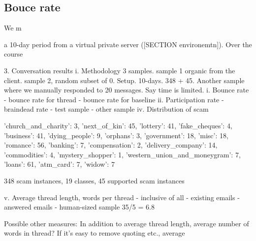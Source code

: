 \begin{center}
\end{center}

\subsection{Bouce rate}
We m


a 10-day period from a virtual private server ([SECTION environemtn]). Over the course 

	3. Conversation results
		i. Methodology 3 samples. sample 1 organic from the client. sample 2, random subset of 
		0. Setup. 10-days. 348 + 45. Another sample where we manually responded to 20 messages. Say time is limited.
		i. Bounce rate
			- bounce rate for thread
			- bounce rate for baseline
		ii. Participation rate
			- braindead rate
			- test sample
			- other sample
		iv. Distribution of scam

{'church_and_charity': 3, 'next_of_kin': 45, 'lottery': 41, 'fake_cheques': 4, 'business': 41, 'dying_people': 9, 'orphans': 3, 'government': 18, 'misc': 18, 'romance': 56, 'banking': 7, 'compensation': 2, 'delivery_company': 14, 'commodities': 4, 'mystery_shopper': 1, 'western_union_and_moneygram': 7, 'loans': 61, 'atm_card': 7, 'widow': 7}

348 scam instances, 19 classes, 45 supported scam instances



		v.  Average thread length, words per thread
			- inclusive of all
			- existing emails
			- answered emails
			- human-sized sample 35/5 = 6.8


Possible other measures: In addition to average thread length, average number of words in thread? If it's easy to remove quoting etc., average %






